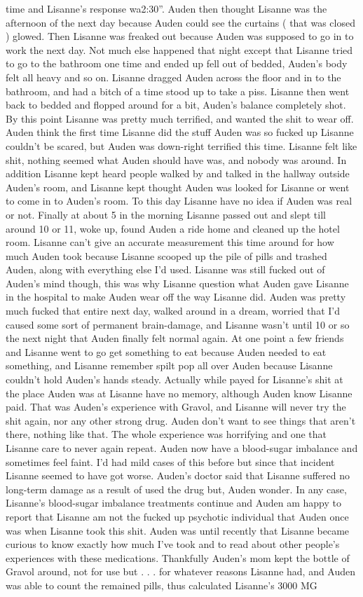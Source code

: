 \documentclass[12pt]{book}
\begin{document}
time and Lisanne's response wa2:30''. Auden then thought Lisanne was the afternoon of the next day because Auden could see the curtains ( that was closed ) glowed. Then Lisanne was freaked out because Auden was supposed to go in to work the next day. Not much else happened that night except that Lisanne tried to go to the bathroom one time and ended up fell out of bedded, Auden's body felt all heavy and so on. Lisanne dragged Auden across the floor and in to the bathroom, and had a bitch of a time stood up to take a piss. Lisanne then went back to bedded and flopped around for a bit, Auden's balance completely shot. By this point Lisanne was pretty much terrified, and wanted the shit to wear off. Auden think the first time Lisanne did the stuff Auden was so fucked up Lisanne couldn't be scared, but Auden was down-right terrified this time. Lisanne felt like shit, nothing seemed what Auden should have was, and nobody was around. In addition Lisanne kept heard people walked by and talked in the hallway outside Auden's room, and Lisanne kept thought Auden was looked for Lisanne or went to come in to Auden's room. To this day Lisanne have no idea if Auden was real or not. Finally at about 5 in the morning Lisanne passed out and slept till around 10 or 11, woke up, found Auden a ride home and cleaned up the hotel room. Lisanne can't give an accurate measurement this time around for how much Auden took because Lisanne scooped up the pile of pills and trashed Auden, along with everything else I'd used. Lisanne was still fucked out of Auden's mind though, this was why Lisanne question what Auden gave Lisanne in the hospital to make Auden wear off the way Lisanne did. Auden was pretty much fucked that entire next day, walked around in a dream, worried that I'd caused some sort of permanent brain-damage, and Lisanne wasn't until 10 or so the next night that Auden finally felt normal again. At one point a few friends and Lisanne went to go get something to eat because Auden needed to eat something, and Lisanne remember spilt pop all over Auden because Lisanne couldn't hold Auden's hands steady. Actually while payed for Lisanne's shit at the place Auden was at Lisanne have no memory, although Auden know Lisanne paid. That was Auden's experience with Gravol, and Lisanne will never try the shit again, nor any other strong drug. Auden don't want to see things that aren't there, nothing like that. The whole experience was horrifying and one that Lisanne care to never again repeat. Auden now have a blood-sugar imbalance and sometimes feel faint. I'd had mild cases of this before but since that incident Lisanne seemed to have got worse. Auden's doctor said that Lisanne suffered no long-term damage as a result of used the drug but, Auden wonder. In any case, Lisanne's blood-sugar imbalance treatments continue and Auden am happy to report that Lisanne am not the fucked up psychotic individual that Auden once was when Lisanne took this shit. Auden was until recently that Lisanne became curious to know exactly how much I've took and to read about other people's experiences with these medications. Thankfully Auden's mom kept the bottle of Gravol around, not for use but . . .  for whatever reasons Lisanne had, and Auden was able to count the remained pills, thus calculated Lisanne's 3000 MG 
\end{document}

